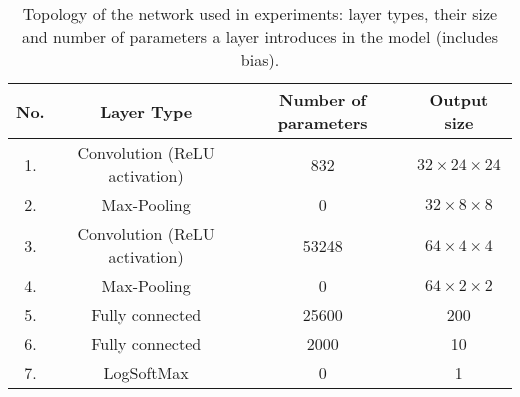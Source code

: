 \documentclass{llncs}
\begin{document}
\begin{table}
    \center
    \begin{tabular}{|c|c|c|c|}


        \hline
        No. & Layer Type & Number of parameters & Output size \\
        \hline
         1. & Convolution (ReLU \cite{Glorot2011} activation) & 832 & $32 \times 24 \times 24$ \\ 
         2. & Max-Pooling & 0 & $32 \times 8 \times 8$ \\
         3. & Convolution (ReLU activation) & 53248 & $64 \times 4 \times 4$ \\
         4. & Max-Pooling & 0 & $64 \times 2 \times 2$ \\
         5. & Fully connected & 25600 & 200 \\
         6. & Fully connected & 2000 & 10 \\
         7. & LogSoftMax & 0 & 1 \\
        \hline
    \end{tabular}
    \caption{Topology of the network used in experiments: layer types, their size and number of parameters a layer introduces in the model (includes bias).}
    \label{table:topology}
    \label{}
\end{table}
\end{document}
